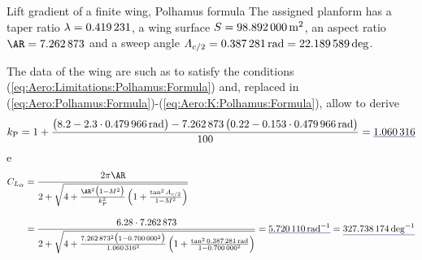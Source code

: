 \documentclass[[12pt,twoside]{book}
\begin{document}
\begin{myExampleX}{Lift gradient of a finite wing, Polhamus formula}{}
The assigned planform has
a taper ratio
$\lambda=\SI[round-precision=2]{\myTaperRatioWing}{}$,
a wing surface
$S=\SI[round-precision=1]{\myAreaWingMTsquared}{\metre^2}$,
an aspect ratio
$\AR=\num[round-precision=2]{\myAspectRatioWing}$
and a sweep angle
$\Lambda_{c/2}=\SI[round-precision=3]{\mySweepHalfChordWingRAD}{\radian}=\SI[round-precision=1]{\mySweepHalfChordWingDEG}{\deg}$.

The data of the wing are such as to satisfy the conditions (\ref{eq:Aero:Limitations:Polhamus:Formula})
and, replaced in (\ref{eq:Aero:Polhamus:Formula})-(\ref{eq:Aero:K:Polhamus:Formula}), 
allow to derive
\[
k_\mathrm{P} 
  =
    1+\dfrac{
      \big(
        \num[round-precision=1]{8.2}
        -\num[round-precision=1]{2.3}
        \cdot \SI[round-precision=3]{\mySweepLEWingRAD}{\radian}
      \big)
      - \num[round-precision=2]{\myAspectRatioWing}\,
      \big(
        \num[round-precision=2]{0.22}-\num[round-precision=3]{0.153}
        \cdot \SI[round-precision=3]{\mySweepLEWingRAD}{\radian}
      \big)
    }{\num[round-precision=0]{100}}
  = \mathunderline{mydarkblue}{ \SI[round-precision=2]{\myKPolhamus}{} }
\]
e
\[
\begin{split}
C_{L_{\mathlarger{\alpha}}} 
  & {}= 
   \frac{ 2\pi\AR
   }{
      2 + \sqrt{ 4+ \frac{\AR^2 \big(1-M^2\big)}{k_\mathrm{P}^2}\left({1+\frac{\tan^2\Lambda_{c/2}}{1-M^2}}\right)}
   }
\\[10pt]
  & {}= 
  \frac{ \num[round-precision=3]{6.28} \cdot \num[round-precision=2]{\myAspectRatioWing}
   }{
      2 + \sqrt{ 4+ 
      \frac{
        \num[round-precision=2]{\myAspectRatioWing}^2 \big( 1-\num[round-precision=2]{\myMach}^2 \big)
      }{
        \SI[round-precision=2]{\myKPolhamus}{}^2}
        \left({ 1 +
          \frac{
            \tan^2 \SI[round-precision=3]{\mySweepHalfChordWingRAD}{\radian}
          }{
            1-\num[round-precision=2]{\myMach}^2
          }
        }\right)
      }
   }
    =\mathunderline{mydarkblue}{ \SI[round-precision=2]{\myCLAlphaWingRAD}{\radian^{-1}} }
    =\mathunderline{mydarkblue}{ \SI[round-precision=3]{\myCLAlphaWingDEG}{\deg^{-1}} }
\end{split}
\]
\end{myExampleX}
\end{document}
